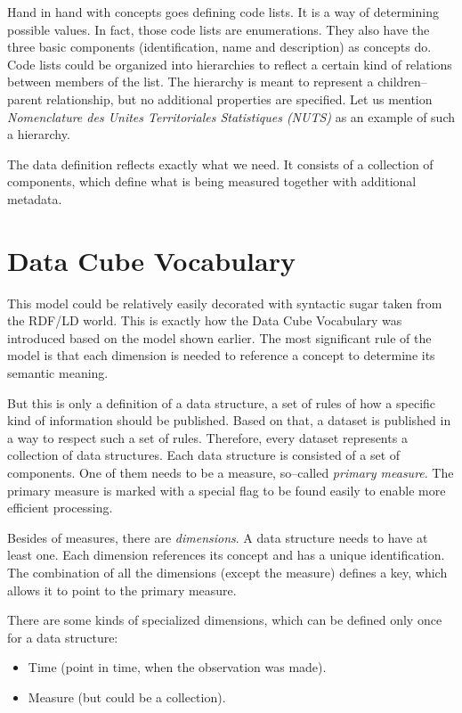 \label{SDMX-code-lists}
Hand in hand with concepts goes defining code lists. It is a way of determining possible
values. In fact, those code lists are enumerations. They also have the three basic components
(identification, name and description) as concepts do. Code lists could be organized into
hierarchies to reflect a certain kind of relations between members of the list. The hierarchy
is meant to represent a children--parent relationship, but no additional properties are specified.
Let us mention \emph{Nomenclature des Unites Territoriales Statistiques (NUTS)} 
as an example of such a hierarchy.

The data definition reflects exactly what we need. It consists of a collection of 
components, which define what is being measured together with additional metadata.

\section{Data Cube Vocabulary}
\label{datacube-vocabulary}

This model could be relatively easily decorated with syntactic sugar taken from the
RDF/LD world. This is exactly how the Data Cube Vocabulary was introduced based
on the model shown earlier. The most significant rule of the model is that each
dimension is needed to reference a concept to determine its semantic meaning.

But this is only a definition of a data structure, a set of rules of how a specific kind of information
should be published. Based on that, a dataset is published in a way to respect such a set
of rules. Therefore, every dataset represents a collection of data structures. Each data
structure is consisted of a set of components. One of them needs to be a measure,
so--called \emph{primary measure}. The primary measure is marked with a special flag to be found
easily to enable more efficient processing.

Besides of measures, there are \emph{dimensions}. A data structure needs to have at least one.
Each dimension references its concept and has a unique identification. The combination of
all the dimensions (except the measure) defines a key, which allows it to point
to the primary measure.

There are some kinds of specialized dimensions, which can be defined only once
for a data structure:

\begin{itemize}
\item Time (point in time, when the observation was made).
\item Measure (but could be a collection).
\end{itemize}

